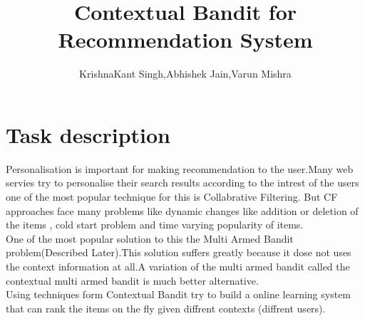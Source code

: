 \documentclass[11pt,letterpaper]{article}
\newcommand{\blue}[1]{\textcolor{RoyalBlue}{#1}}
\newcommand{\instructions}[1]{\blue{\textit{#1}}}
\renewcommand{\instructions}[1]{}
\begin{document}
\title{Contextual Bandit for Recommendation System}
\author{KrishnaKant Singh,Abhishek Jain,Varun Mishra}
\maketitle



\instructions{If you are taking CS446 for 4 hours credit, you need to
  do a research project.\\
This is a \LaTeX template for the initial proposal,  but should also give you a start on the final report.\\
The blue pieces of text  in this template are either instructions ({\tt$\backslash$instructions\{...\}}) or indicate where you need to fill in something ({\tt$\backslash$fillme\{...\}}).  
You should replace all the {\tt$\backslash$fillme\{...\}} commands with your own text.
To make the instructions disappear, please uncomment the 
\begin{center}
{\tt$\backslash$renewcommand\{$\backslash$instructions\}[1]\{\}}\\
\end{center}
lines in the preamble (just above  {\tt $\backslash$begin\{document\}} of this .tex file) by removing the leading \% marks, 
recompile (run \LaTeX again) and submit the PDF on Compass.\\
The template for the final report is at
\url{http://courses.engr.illinois.edu/cs446/Projects/CS446proj.tex}
(or
\url{http://courses.engr.illinois.edu/cs446/Projects/CS446proj.pdf}
for the pdf)
}
\section*{Task description}
\instructions{Describe the task you want to tackle in your project.}
Personalisation is important for making recommendation to the user.Many web servies try to personalise their search results according to the intrest of the users one of the most popular technique for this is  Collabrative Filtering. But CF approaches face many problems like  dynamic changes like addition or deletion of the items , cold start problem and time varying popularity of items.\\
One of the most popular solution to this the Multi Armed Bandit problem(Described Later).This solution suffers greatly because it dose not uses the context information at all.A variation of the multi armed bandit called the contextual multi armed bandit is much better alternative.\\
Using techniques form Contextual Bandit try to build a online learning system that can rank the items on the fly given diffrent contexts (diffrent users).
\cite{Conte89:online}
\cite{Learn49:online}
\end{document}
